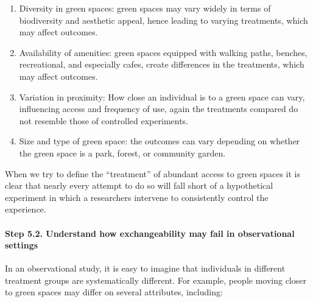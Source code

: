 \documentclass[
  singlecolumn]{article}
\let\oldparagraph\paragraph
\renewcommand{\paragraph}[1]{\oldparagraph{#1}\mbox{}}
\begin{document}
\begin{enumerate}
\def\labelenumi{\alph{enumi}.}
\item
  Diversity in green spaces: green spaces may vary widely in terms of
  biodiversity and aesthetic appeal, hence leading to varying
  treatments, which may affect outcomes.
\item
  Availability of amenities: green spaces equipped with walking paths,
  benches, recreational, and especially cafes, create differences in the
  treatments, which may affect outcomes.
\item
  Variation in proximity: How close an individual is to a green space
  can vary, influencing access and frequency of use, again the
  treatments compared do not resemble those of controlled experiments.
\item
  Size and type of green space: the outcomes can vary depending on
  whether the green space is a park, forest, or community garden.
\end{enumerate}

When we try to define the ``treatment'' of abundant access to green
spaces it is clear that nearly every attempt to do so will fall short of
a hypothetical experiment in which a researchers intervene to
consistently control the experience.

\paragraph{\texorpdfstring{\textbf{Step 5.2. Understand how
exchangeability may fail in observational
settings}}{Step 5.2. Understand how exchangeability may fail in observational settings}}\label{step-5.2.-understand-how-exchangeability-may-fail-in-observational-settings}

In an observational study, it is easy to imagine that individuals in
different treatment groups are systematically different. For example,
people moving closer to green spaces may differ on several attributes,
including:
\end{document}
